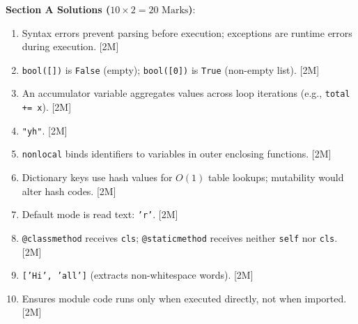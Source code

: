\begin{solutionbox}
\noindent\textbf{Section A Solutions ($10 \times 2 = 20\text{ Marks}$)}:
\begin{enumerate}
    \item Syntax errors prevent parsing before execution; exceptions are runtime errors during execution. [2M]
    \item \texttt{bool([])} is \texttt{False} (empty); \texttt{bool([0])} is \texttt{True} (non-empty list). [2M]
    \item An accumulator variable aggregates values across loop iterations (e.g., \texttt{total += x}). [2M]
    \item \texttt{"yh"}. [2M]
    \item \texttt{nonlocal} binds identifiers to variables in outer enclosing functions. [2M]
    \item Dictionary keys use hash values for $O(1)$ table lookups; mutability would alter hash codes. [2M]
    \item Default mode is read text: \texttt{'r'}. [2M]
    \item \texttt{@classmethod} receives \texttt{cls}; \texttt{@staticmethod} receives neither \texttt{self} nor \texttt{cls}. [2M]
    \item \texttt{['Hi', 'all']} (extracts non-whitespace words). [2M]
    \item Ensures module code runs only when executed directly, not when imported. [2M]
\end{enumerate}


\end{solutionbox}
